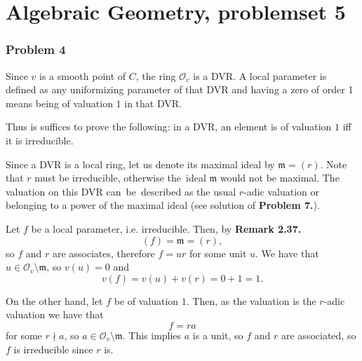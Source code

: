 




\chapter{Algebraic Geometry, problemset 5}

\subsection*{Problem 4}

Since \( v \) is a smooth point of \( C \), the ring \( \mathcal{O}_v \)
is a DVR. A local parameter is defined as any uniformizing parameter
of that DVR and having a zero of order 1 means being of valuation \( 1 \)
in that DVR.

Thus is suffices to prove the following: in a DVR, an element is of valuation
\( 1 \) iff it is irreducible.

Since a DVR is a local ring, let us denote its maximal ideal by 
\( \mathfrak{m} = (r) \). Note that \( r \) must be irreducible, otherwise
the~ideal \( \mathfrak{m} \) would not be maximal. The valuation on this DVR
can~be~described as the usual \( r \)-adic valuation or belonging to a power of 
the maximal ideal (see solution of {\bf Problem 7.}).

Let \( f \) be a local parameter, i.e. irreducible. Then, by {\bf Remark 2.37.}
\[ 
    (f) = \mathfrak{m} = (r), 
\]
so \( f \) and \( r \) are associates, therefore \( f = ur \) for some unit \( u \).
We have that \( u \in \mathcal{O}_v \setminus \mathfrak{m} \), so \( v(u) = 0 \) and
\[ 
    v(f) = v(u) + v(r) = 0 + 1 = 1. 
\]

On the other hand, let \( f \) be of valuation \( 1 \). Then, as the valuation
is the \( r \)-adic valuation we have that
\[ 
    f = ra 
\]
for some \( r \nmid a \), so \( a \in \mathcal{O}_v \setminus \mathfrak{m} \).
This implies \( a \) is a unit, so \( f \) and \( r \) are associated,
so \( f \) is irreducible since \( r \) is.

